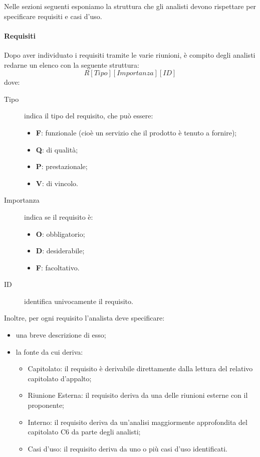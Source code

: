 Nelle sezioni seguenti esponiamo la struttura che gli analisti devono rispettare per specificare requisiti e casi d'uso.

\paragraph{Requisiti} 
Dopo aver individuato i requisiti tramite le varie riunioni, è compito degli analisti redarne un elenco con la seguente struttura:
	\[R[Tipo][Importanza][ID]\]
dove:
\begin{description}
	\item[Tipo] indica il tipo del requisito, che può essere:
	\begin{itemize}
		\item \textbf{F}: funzionale (cioè un servizio che il prodotto è tenuto a fornire);
		\item \textbf{Q}: di qualità;
		\item \textbf{P}: prestazionale;
		\item \textbf{V}: di vincolo.
	\end{itemize}
	\item[Importanza] indica se il requisito è:
	\begin{itemize}
		\item \textbf{O}: obbligatorio;
		\item \textbf{D}: desiderabile;
		\item \textbf{F}: facoltativo. 
	\end{itemize}
	\item[ID] identifica univocamente il requisito.
\end{description}
Inoltre, per ogni requisito l'analista deve specificare:
\begin{itemize}
	\item una breve descrizione di esso;
	\item la fonte da cui deriva:
	\begin{itemize}
		\item Capitolato: il requisito è derivabile direttamente dalla lettura del relativo capitolato d'appalto;
		\item Riunione Esterna: il requisito deriva da una delle riunioni esterne con il proponente;
		\item Interno: il requisito deriva da un'analisi maggiormente approfondita del capitolato C6 da parte degli analisti;
		\item Casi d'uso: il requisito deriva da uno o più casi d'uso identificati.
	\end{itemize}
\end{itemize}
